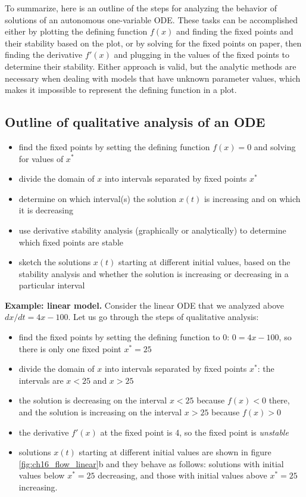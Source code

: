 \documentclass[
]{book}
\theoremstyle{definition}
\theoremstyle{definition}
\theoremstyle{definition}
\theoremstyle{remark}
\begin{document}
To summarize, here is an outline of the steps for analyzing the behavior of solutions of an autonomous one-variable ODE. These tasks can be accomplished either by plotting the defining function \(f(x)\) and finding the fixed points and their stability based on the plot, or by solving for the fixed points on paper, then finding the derivative \(f'(x)\) and plugging in the values of the fixed points to determine their stability. Either approach is valid, but the analytic methods are necessary when dealing with models that have unknown parameter values, which makes it impossible to represent the defining function in a plot.

\hypertarget{outline-of-qualitative-analysis-of-an-ode}{%
\subsection{Outline of qualitative analysis of an ODE}\label{outline-of-qualitative-analysis-of-an-ode}}

\begin{itemize}
\item
  find the fixed points by setting the defining function \(f(x)=0\) and solving for values of \(x^*\)
\item
  divide the domain of \(x\) into intervals separated by fixed points \(x^*\)
\item
  determine on which interval(s) the solution \(x(t)\) is increasing and on which it is decreasing
\item
  use derivative stability analysis (graphically or analytically) to determine which fixed points are stable
\item
  sketch the solutions \(x(t)\) starting at different initial values, based on the stability analysis and whether the solution is increasing or decreasing in a particular interval
\end{itemize}

\textbf{Example: linear model.} Consider the linear ODE that we analyzed above \(dx/dt = 4x -100\). Let us go through the steps of qualitative analysis:

\begin{itemize}
\item
  find the fixed points by setting the defining function to 0: \(0 = 4x -100\), so there is only one fixed point \(x^* = 25\)
\item
  divide the domain of \(x\) into intervals separated by fixed points \(x^*\): the intervals are \(x<25\) and \(x>25\)
\item
  the solution is decreasing on the interval \(x<25\) because \(f(x)<0\) there, and the solution is increasing on the interval \(x>25\) because \(f(x)>0\)
\item
  the derivative \(f'(x)\) at the fixed point is 4, so the fixed point is \emph{unstable}
\item
  solutions \(x(t)\) starting at different initial values are shown in figure \ref{fig:ch16_flow_linear}b and they behave as follows: solutions with initial values below \(x^*=25\) decreasing, and those with initial values above \(x^*=25\) increasing.
\end{itemize}
\end{document}
